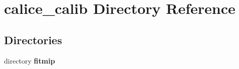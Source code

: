 \section{calice\-\_\-calib Directory Reference}
\label{dir_c2968450317907f1f2fd69207025813d}
\subsection*{Directories}
\begin{DoxyCompactItemize}
\item 
directory {\bf fitmip}
\end{DoxyCompactItemize}
